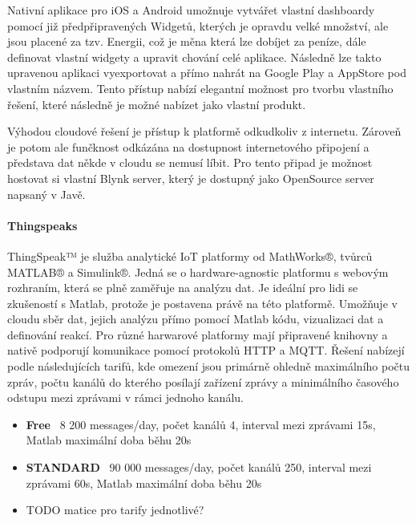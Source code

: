 \documentclass[thesis=B,czech]{FITthesis}[2019/12/23]
\begin{document}
Nativní aplikace pro iOS a Android umožnuje vytvářet vlastní dashboardy pomocí již předpřipravených Widgetů, kterých je opravdu velké množství, ale jsou placené za tzv. Energii, což je měna která lze dobíjet za peníze, dále definovat vlastní widgety a upravit chování celé aplikace. Následně lze takto upravenou aplikaci vyexportovat a přímo nahrát na Google Play a AppStore pod vlastním názvem. Tento přístup nabízí elegantní možnost pro tvorbu vlastního řešení, které následně je možné nabízet jako vlastní produkt.

Výhodou cloudové řešení je přístup k platformě odkudkoliv z internetu. Zároveň je potom ale funčknost odkázána na dostupnost internetového připojení a představa dat někde v cloudu se nemusí líbit. Pro tento připad je možnost hostovat si vlastní Blynk server, který je dostupný jako OpenSource server napsaný v Javě. %

\paragraph{Thingspeaks}
ThingSpeak™ je služba analytické IoT platformy od MathWorks®, tvůrců MATLAB® a Simulink®. Jedná se o hardware-agnostic platformu s webovým rozhraním, která se plně zaměřuje na analýzu dat. Je ideální pro lidi se zkušeností s Matlab, protože je postavena právě na této platformě. Umožňuje v cloudu sběr dat, jejich analýzu přímo pomocí Matlab kódu, vizualizaci dat a definování reakcí. Pro různé harwarové platformy mají připravené knihovny a nativě podporují komunikace pomocí protokolů HTTP a MQTT. Řešení nabízejí podle následujících tarifů, kde omezení jsou primárně ohledně maximálního počtu zpráv, počtu kanálů do kterého posílají zařízení zprávy a minimálního časového odstupu mezi zprávami v rámci jednoho kanálu.
\begin{itemize}
    \item \textbf{Free} ~8 200 messages/day, počet kanálů 4, interval mezi zprávami 15s, Matlab maximální doba běhu 20s
    \item \textbf{STANDARD} ~90 000 messages/day, počet kanálů 250, interval mezi zprávami 60s, Matlab maximální doba běhu 20s
    \item TODO matice pro tarify jednotlivé?
\end{itemize}
\end{document}
